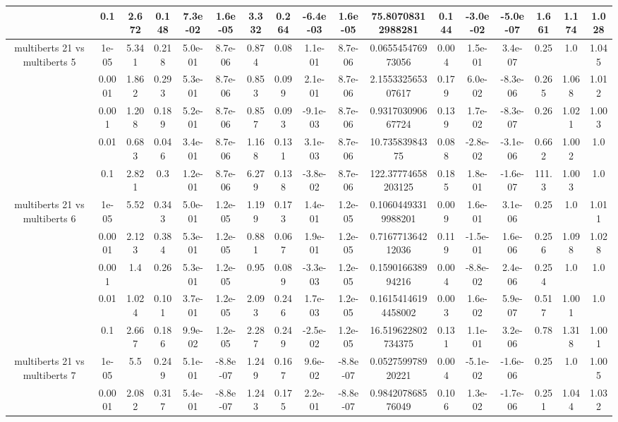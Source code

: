 \begin{tabular}{|c|c|c|c|c|c|c|c|c|c|c|c|c|c|c|c|c|}
 & 0.1 & 2.672 & 0.148 & 7.3e-02 & 1.6e-05 & 3.332 & 0.264 & -6.4e-03 & 1.6e-05 & 75.80708312988281 & 0.144 & -3.0e-02 & -5.0e-07 & 1.661 & 1.174 & 1.028 \\
\hline
\multirow{5}{*}{multiberts 21 vs multiberts 5} & 1e-05 & 5.341 & 0.218 & 5.0e-01 & 8.7e-06 & 0.874 & 0.08 & 1.1e-01 & 8.7e-06 & 0.065545476973056 & 0.004 & 1.5e-01 & 3.4e-07 & 0.25 & 1.0 & 1.045 \\
 & 0.0001 & 1.862 & 0.293 & 5.3e-01 & 8.7e-06 & 0.853 & 0.099 & 2.1e-01 & 8.7e-06 & 2.155332565307617 & 0.179 & 6.0e-02 & -8.3e-06 & 0.265 & 1.068 & 1.012 \\
 & 0.001 & 1.208 & 0.189 & 5.2e-01 & 8.7e-06 & 0.857 & 0.093 & -9.1e-03 & 8.7e-06 & 0.931703090667724 & 0.139 & 1.7e-02 & -8.3e-07 & 0.26 & 1.021 & 1.003 \\
 & 0.01 & 0.683 & 0.046 & 3.4e-01 & 8.7e-06 & 1.168 & 0.131 & 3.1e-03 & 8.7e-06 & 10.73583984375 & 0.088 & -2.8e-02 & -3.1e-06 & 0.662 & 1.002 & 1.0 \\
 & 0.1 & 2.821 & 0.3 & 1.2e-01 & 8.7e-06 & 6.279 & 0.138 & -3.8e-02 & 8.7e-06 & 122.37774658203125 & 0.185 & 1.8e-01 & -1.6e-07 & 111.3 & 1.003 & 1.0 \\
\hline
\multirow{5}{*}{multiberts 21 vs multiberts 6} & 1e-05 & 5.52 & 0.343 & 5.0e-01 & 1.2e-05 & 1.199 & 0.173 & 1.4e-01 & 1.2e-05 & 0.10604493319988201 & 0.009 & 1.6e-01 & 3.1e-06 & 0.25 & 1.0 & 1.011 \\
 & 0.0001 & 2.123 & 0.384 & 5.3e-01 & 1.2e-05 & 0.881 & 0.067 & 1.9e-01 & 1.2e-05 & 0.716771364212036 & 0.119 & -1.5e-01 & 1.6e-06 & 0.256 & 1.098 & 1.028 \\
 & 0.001 & 1.4 & 0.26 & 5.3e-01 & 1.2e-05 & 0.95 & 0.089 & -3.3e-03 & 1.2e-05 & 0.159016638994216 & 0.004 & -8.8e-02 & 2.4e-06 & 0.254 & 1.0 & 1.0 \\
 & 0.01 & 1.024 & 0.101 & 3.7e-01 & 1.2e-05 & 2.093 & 0.246 & 1.7e-03 & 1.2e-05 & 0.16154146194458002 & 0.003 & 1.6e-02 & 5.9e-07 & 0.517 & 1.001 & 1.0 \\
 & 0.1 & 2.667 & 0.186 & 9.9e-02 & 1.2e-05 & 2.287 & 0.249 & -2.5e-02 & 1.2e-05 & 16.519622802734375 & 0.131 & 1.1e-01 & 3.2e-06 & 0.78 & 1.318 & 1.001 \\
\hline
\multirow{5}{*}{multiberts 21 vs multiberts 7} & 1e-05 & 5.5 & 0.249 & 5.1e-01 & -8.8e-07 & 1.249 & 0.167 & 9.6e-02 & -8.8e-07 & 0.052759978920221 & 0.004 & -5.1e-02 & -1.6e-06 & 0.25 & 1.0 & 1.005 \\
 & 0.0001 & 2.082 & 0.317 & 5.4e-01 & -8.8e-07 & 1.243 & 0.175 & 2.2e-01 & -8.8e-07 & 0.984207868576049 & 0.106 & 1.3e-02 & -1.7e-06 & 0.251 & 1.044 & 1.032 \\

\end{tabular}
